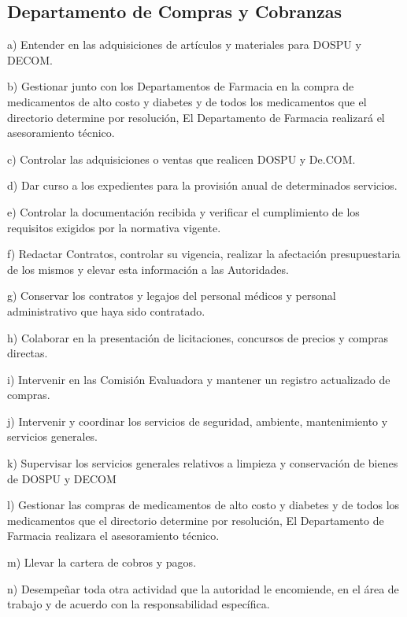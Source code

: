 \subsection{Departamento de Compras y Cobranzas}
\begin{displayquote}
a) Entender en las adquisiciones de artículos y materiales para DOSPU y DECOM.

b) Gestionar junto con los Departamentos de Farmacia en la compra de medicamentos de alto costo y diabetes y de todos los medicamentos que el directorio determine por resolución, El Departamento de Farmacia realizará el asesoramiento técnico.

c) Controlar las adquisiciones o ventas que realicen DOSPU y De.COM.

d) Dar curso a los expedientes para la provisión anual de determinados servicios.

e) Controlar la documentación recibida y verificar el cumplimiento de los requisitos exigidos por la normativa vigente.

f) Redactar Contratos, controlar su vigencia, realizar la afectación presupuestaria de los mismos y elevar esta información a las Autoridades.

g) Conservar los contratos y legajos del personal médicos y personal administrativo que haya sido contratado.

h) Colaborar en la presentación de licitaciones, concursos de precios y compras directas.

i) Intervenir en las Comisión Evaluadora y mantener un registro actualizado de compras.

j) Intervenir y coordinar los servicios de seguridad, ambiente, mantenimiento y servicios generales.

k) Supervisar los servicios generales relativos a limpieza y conservación de bienes de DOSPU y DECOM

l) Gestionar las compras de medicamentos de alto costo y diabetes y de todos los medicamentos que el directorio determine por resolución, El Departamento de Farmacia realizara el asesoramiento técnico.

m) Llevar la cartera de cobros y pagos.

n) Desempeñar toda otra actividad que la autoridad le encomiende, en el área de trabajo y de acuerdo con la responsabilidad específica.
\hfill\parencite{CSOrd17}
\end{displayquote}

